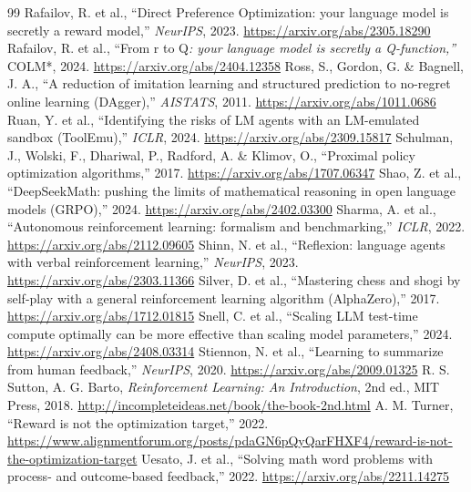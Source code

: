\documentclass{article}
\begin{document}
\begin{thebibliography}{99}
 Rafailov, R. et al., ``Direct Preference Optimization: your language model is secretly a reward model,'' \emph{NeurIPS}, 2023. \url{https://arxiv.org/abs/2305.18290}
 Rafailov, R. et al., ``From r to Q\emph{: your language model is secretly a Q-function,'' }COLM*, 2024. \url{https://arxiv.org/abs/2404.12358}
 Ross, S., Gordon, G. \& Bagnell, J. A., ``A reduction of imitation learning and structured prediction to no-regret online learning (DAgger),'' \emph{AISTATS}, 2011. \url{https://arxiv.org/abs/1011.0686}
 Ruan, Y. et al., ``Identifying the risks of LM agents with an LM-emulated sandbox (ToolEmu),'' \emph{ICLR}, 2024. \url{https://arxiv.org/abs/2309.15817}
 Schulman, J., Wolski, F., Dhariwal, P., Radford, A. \& Klimov, O., ``Proximal policy optimization algorithms,'' 2017. \url{https://arxiv.org/abs/1707.06347}
 Shao, Z. et al., ``DeepSeekMath: pushing the limits of mathematical reasoning in open language models (GRPO),'' 2024. \url{https://arxiv.org/abs/2402.03300}
 Sharma, A. et al., ``Autonomous reinforcement learning: formalism and benchmarking,'' \emph{ICLR}, 2022. \url{https://arxiv.org/abs/2112.09605}
 Shinn, N. et al., ``Reflexion: language agents with verbal reinforcement learning,'' \emph{NeurIPS}, 2023. \url{https://arxiv.org/abs/2303.11366}
 Silver, D. et al., ``Mastering chess and shogi by self-play with a general reinforcement learning algorithm (AlphaZero),'' 2017. \url{https://arxiv.org/abs/1712.01815}
 Snell, C. et al., ``Scaling LLM test-time compute optimally can be more effective than scaling model parameters,'' 2024. \url{https://arxiv.org/abs/2408.03314}
 Stiennon, N. et al., ``Learning to summarize from human feedback,'' \emph{NeurIPS}, 2020. \url{https://arxiv.org/abs/2009.01325}
 R. S. Sutton, A. G. Barto, \emph{Reinforcement Learning: An Introduction}, 2nd ed., MIT Press, 2018. \url{http://incompleteideas.net/book/the-book-2nd.html}
 A. M. Turner, ``Reward is not the optimization target,'' 2022. \url{https://www.alignmentforum.org/posts/pdaGN6pQyQarFHXF4/reward-is-not-the-optimization-target}
 Uesato, J. et al., ``Solving math word problems with process- and outcome-based feedback,'' 2022. \url{https://arxiv.org/abs/2211.14275}

\end{thebibliography}
\end{document}
